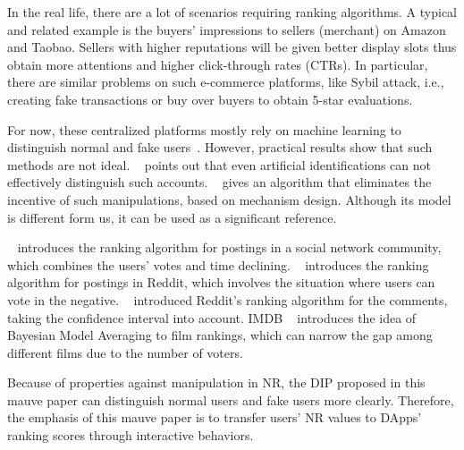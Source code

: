In the real life, there are a lot of scenarios requiring ranking algorithms. A
typical and related example is the buyers' impressions to sellers (merchant) on
Amazon and Taobao. Sellers with higher reputations will be given better display
slots thus obtain more attentions and higher click-through rates (CTRs). In
particular, there are similar problems on such e-commerce platforms, like Sybil attack, i.e., creating fake transactions or buy over buyers to obtain 5-star evaluations.

For now, these centralized platforms mostly rely on machine learning to
distinguish normal and fake
users~\cite{mukherjee2013spotting,jindal2008opinion,yoo2009comparison}.
However, practical results show that such methods are not ideal.
~\cite{ott2011finding} points out that even artificial identifications can not
effectively distinguish such accounts. ~\cite{cai2016mechanism} gives an
algorithm that eliminates the incentive of such manipulations, based on
mechanism design. Although its model is different form us, it can be used as a significant reference.

~\cite{salihefendic2010hacker} introduces the ranking algorithm for postings in
a social network community, which combines the users' votes and time declining. ~\cite{salihefendic2010reddit} introduces the ranking algorithm for postings in Reddit, which involves the situation where users can vote in the negative.
~\cite{miller2009how} introduced Reddit's ranking algorithm for the comments, taking the confidence interval into account.
IMDB ~\cite {IMDB} introduces the idea of Bayesian Model Averaging to film
rankings, which can narrow the gap among different films due to the number of voters.

Because of properties against manipulation in NR, the DIP proposed in this mauve paper can distinguish normal users and fake users more clearly. Therefore, the emphasis of this mauve paper is to transfer users' NR values to DApps' ranking scores through interactive behaviors.


